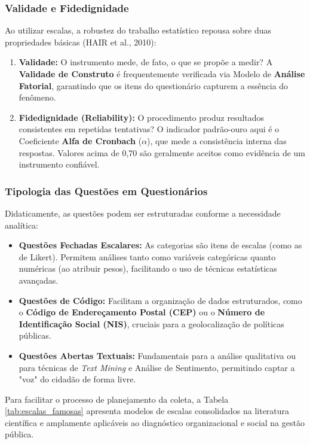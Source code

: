 \subsubsection{Validade e Fidedignidade}Ao utilizar escalas, a robustez do trabalho estatístico repousa sobre duas propriedades básicas (HAIR et al., 2010):

\begin{enumerate}
\item \textbf{Validade:} O instrumento mede, de fato, o que se propõe a medir? A \textbf{Validade de Construto} é frequentemente verificada via Modelo de \textbf{Análise Fatorial}, garantindo que os itens do questionário capturem a essência do fenômeno.
\item \textbf{Fidedignidade (Reliability):} O procedimento produz resultados consistentes em repetidas tentativas? O indicador padrão-ouro aqui é o Coeficiente \textbf{Alfa de Cronbach} ($\alpha$), que mede a consistência interna das respostas. Valores acima de 0,70 são geralmente aceitos como evidência de um instrumento confiável.
\end{enumerate}

\subsubsection{Tipologia das Questões em Questionários}Didaticamente, as questões podem ser estruturadas conforme a necessidade analítica:

\begin{itemize}
\item \textbf{Questões Fechadas Escalares:} As categorias são itens de escalas (como as de Likert). Permitem análises tanto como variáveis categóricas quanto numéricas (ao atribuir pesos), facilitando o uso de técnicas estatísticas avançadas.
\item \textbf{Questões de Código:} Facilitam a organização de dados estruturados, como o \textbf{Código de Endereçamento Postal (CEP)} ou o \textbf{Número de Identificação Social (NIS)}, cruciais para a geolocalização de políticas públicas.
\item \textbf{Questões Abertas Textuais:} Fundamentais para a análise qualitativa ou para técnicas de \textit{Text Mining} e Análise de Sentimento, permitindo captar a "voz" do cidadão de forma livre.
\end{itemize}

Para facilitar o processo de planejamento da coleta, a Tabela \ref{tab:escalas_famosas} apresenta modelos de escalas consolidados na literatura científica e amplamente aplicáveis ao diagnóstico organizacional e social na gestão pública.

